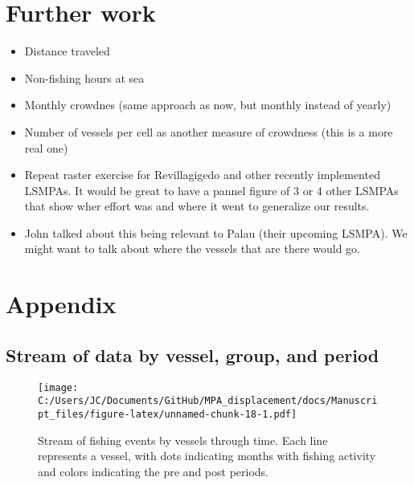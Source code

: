\documentclass[11pt,]{article}
\providecommand{\tightlist}{%
  \setlength{\itemsep}{0pt}\setlength{\parskip}{0pt}}
\begin{document}
\hypertarget{further-work}{%
\section{Further work}\label{further-work}}

\begin{itemize}
\tightlist
\item
  Distance traveled
\item
  Non-fishing hours at sea
\item
  Monthly crowdnes (same approach as now, but monthly instead of yearly)
\item
  Number of vessels per cell as another measure of crowdness (this is a
  more real one)
\item
  Repeat raster exercise for Revillagigedo and other recently
  implemented LSMPAs. It would be great to have a pannel figure of 3 or
  4 other LSMPAs that show wher effort was and where it went to
  generalize our results.
\item
  John talked about this being relevant to Palau (their upcoming LSMPA).
  We might want to talk about where the vessels that are there would go.
\end{itemize}



\clearpage

\hypertarget{appendix}{%
\section{Appendix}\label{appendix}}

\setcounter{table}{0}  \renewcommand{\thetable}{S\arabic{table}} \setcounter{figure}{0} \renewcommand{\thefigure}{S\arabic{figure}}

\hypertarget{stream-of-data-by-vessel-group-and-period}{%
\subsection{Stream of data by vessel, group, and
period}\label{stream-of-data-by-vessel-group-and-period}}

\begin{figure}
\centering
\texttt{[image: C:/Users/JC/Documents/GitHub/MPA\_displacement/docs/Manuscript\_files/figure-latex/unnamed-chunk-18-1.pdf]}
\caption{\label{fig:unnamed-chunk-18}\label{fig:baci_strict}Stream of
fishing events by vessels through time. Each line represents a vessel,
with dots indicating months with fishing activity and colors indicating
the pre and post periods.}
\end{figure}
\end{document}
